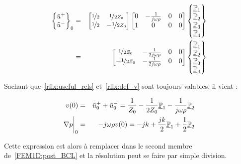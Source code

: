 \begin{eqnarray*}
\begin{Bmatrix}\tilde{u}^+\\\tilde{u}^-\end{Bmatrix}_0 & = &
\begin{bmatrix}
	\nicefrac{1}{2} & \nicefrac{1}{2Z_0}\\
	\nicefrac{1}{2} & -\nicefrac{1}{2Z_0}\\
\end{bmatrix}
\begin{bmatrix}
	0 & -\frac{1}{j\omega\rho} & 0 & 0\\
	1 & 0 & 0 & 0\\
\end{bmatrix}
\begin{Bmatrix}\underline{\mathbb{P}}_1\\\underline{\mathbb{P}}_2\\\underline{\mathbb{P}}_3\\\underline{\mathbb{P}}_4\end{Bmatrix}\\
& = & \begin{bmatrix}
	\nicefrac{1}{2Z_0} & -\frac{1}{2j\omega\rho} & 0 & 0\\
	-\nicefrac{1}{2Z_0} & -\frac{1}{2j\omega\rho} & 0 & 0\\
\end{bmatrix}
\begin{Bmatrix}\underline{\mathbb{P}}_1\\\underline{\mathbb{P}}_2\\\underline{\mathbb{P}}_3\\\underline{\mathbb{P}}_4\end{Bmatrix}\\
\end{eqnarray*}

Sachant que~\eqref{rflx:useful_rels} et~\eqref{rflx:def_v} sont toujours valables, il vient :

\begin{eqnarray*}
v(0) & = & \tilde{u}^+_0+\tilde{u}^-_0 = \frac{1}{Z_0} - \frac{1}{2Z_0}\underline{\mathbb{P}}_1 - \frac{1}{j\omega\rho}\underline{\mathbb{P}}_2\\
\nabla p\bigg|_0 & = & -j\omega\rho v(0) = -jk + \frac{jk}{2}\underline{\mathbb{P}}_1 + \frac{1}{2}\underline{\mathbb{P}}_2
\end{eqnarray*}

Cette expression est alors à remplacer dans le second membre de~\eqref{FEM1D:post_BCL} et la résolution peut se faire
par simple division.
